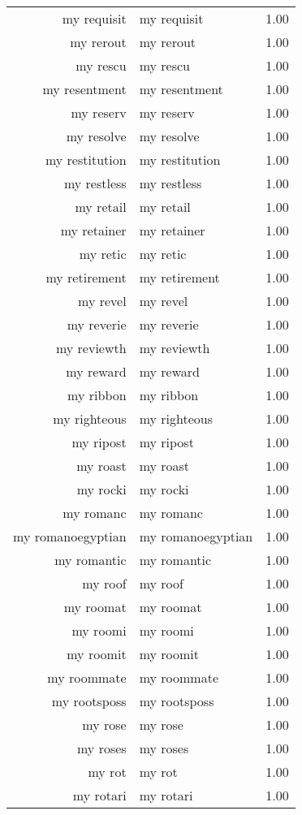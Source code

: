 \begin{table}[ht]
\begin{tabular}{rlr}
  my requisit & my requisit & 1.00 \\ 
  my rerout & my rerout & 1.00 \\ 
  my rescu & my rescu & 1.00 \\ 
  my resentment & my resentment & 1.00 \\ 
  my reserv & my reserv & 1.00 \\ 
  my resolve & my resolve & 1.00 \\ 
  my restitution & my restitution & 1.00 \\ 
  my restless & my restless & 1.00 \\ 
  my retail & my retail & 1.00 \\ 
  my retainer & my retainer & 1.00 \\ 
  my retic & my retic & 1.00 \\ 
  my retirement & my retirement & 1.00 \\ 
  my revel & my revel & 1.00 \\ 
  my reverie & my reverie & 1.00 \\ 
  my reviewth & my reviewth & 1.00 \\ 
  my reward & my reward & 1.00 \\ 
  my ribbon & my ribbon & 1.00 \\ 
  my righteous & my righteous & 1.00 \\ 
  my ripost & my ripost & 1.00 \\ 
  my roast & my roast & 1.00 \\ 
  my rocki & my rocki & 1.00 \\ 
  my romanc & my romanc & 1.00 \\ 
  my romanoegyptian & my romanoegyptian & 1.00 \\ 
  my romantic & my romantic & 1.00 \\ 
  my roof & my roof & 1.00 \\ 
  my roomat & my roomat & 1.00 \\ 
  my roomi & my roomi & 1.00 \\ 
  my roomit & my roomit & 1.00 \\ 
  my roommate & my roommate & 1.00 \\ 
  my rootsposs & my rootsposs & 1.00 \\ 
  my rose & my rose & 1.00 \\ 
  my roses & my roses & 1.00 \\ 
  my rot & my rot & 1.00 \\ 
  my rotari & my rotari & 1.00 \\ 

\end{tabular}
\end{table}
